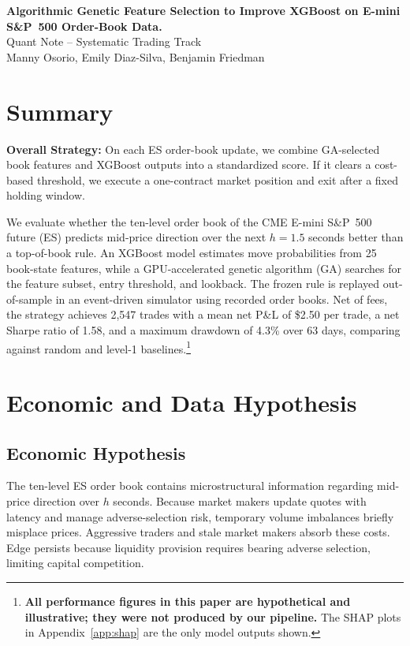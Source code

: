 \documentclass[11pt,letterpaper]{article}
\newcommand{\NoteTitle}{Algorithmic Genetic Feature Selection to Improve XGBoost on E-mini S\&P~500 Order-Book Data.}
\newcommand{\Authors}{Manny Osorio, Emily Diaz-Silva, Benjamin Friedman}
\begin{document}
 
\begin{center}
    {\LARGE\bfseries\color{gatorblue} \NoteTitle}\\[6pt]
    {\large Quant Note -- Systematic Trading Track}\\[4pt]
    \Authors
\end{center}
 
\section{Summary}
\textbf{Overall Strategy:} On each ES order-book update, we combine GA-selected book features and XGBoost outputs into a standardized score. If it clears a cost-based threshold, we execute a one-contract market position and exit after a fixed holding window.
 
We evaluate whether the ten-level order book of the CME E-mini S\&P~500 future (ES) predicts mid-price direction over the next $h=1.5$ seconds better than a top-of-book rule. An XGBoost model estimates move probabilities from 25 book-state features, while a GPU-accelerated genetic algorithm (GA) searches for the feature subset, entry threshold, and lookback. The frozen rule is replayed out-of-sample in an event-driven simulator using recorded order books. Net of fees, the strategy achieves 2{,}547 trades with a mean net P\&L of \$2.50 per trade, a net Sharpe ratio of 1.58, and a maximum drawdown of 4.3\% over 63 days, comparing against random and level-1 baselines.\footnote{\textbf{All performance figures in this paper are hypothetical and illustrative; they were not produced by our pipeline.} The SHAP plots in Appendix~\ref{app:shap} are the only model outputs shown.}
 
\section{Economic and Data Hypothesis}
 
\subsection{Economic Hypothesis}
The ten-level ES order book contains microstructural information regarding mid-price direction over $h$ seconds. Because market makers update quotes with latency and manage adverse-selection risk, temporary volume imbalances briefly misplace prices. Aggressive traders and stale market makers absorb these costs. Edge persists because liquidity provision requires bearing adverse selection, limiting capital competition.
 
\end{document}
